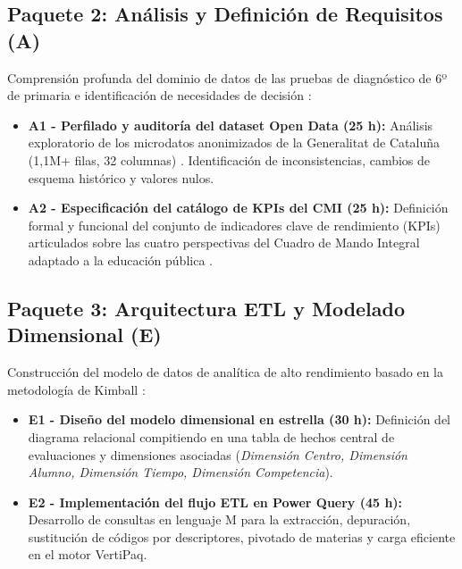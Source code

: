 \documentclass[12pt, a4paper, twoside]{report}
\begin{document}
\subsection{Paquete 2: Análisis y Definición de Requisitos (A)}
Comprensión profunda del dominio de datos de las pruebas de diagnóstico de 6º de primaria e identificación de necesidades de decisión \cite{mandinach2012data}:
\begin{itemize} [itemsep = 7pt]
    \item \textbf{A1 - Perfilado y auditoría del dataset Open Data (25 h):} Análisis exploratorio de los microdatos anonimizados de la Generalitat de Cataluña (1,1M+ filas, 32 columnas) \cite{transparencia_catalunya_2024}. Identificación de inconsistencias, cambios de esquema histórico y valores nulos.
    \item \textbf{A2 - Especificación del catálogo de KPIs del CMI (25 h):} Definición formal y funcional del conjunto de indicadores clave de rendimiento (KPIs) articulados sobre las cuatro perspectivas del Cuadro de Mando Integral adaptado a la educación pública \cite{niven2008balanced, kaplan1992balanced}.
\end{itemize}

\subsection{Paquete 3: Arquitectura ETL y Modelado Dimensional (E)}
Construcción del modelo de datos de analítica de alto rendimiento basado en la metodología de Kimball \cite{kimball2013data}:
\begin{itemize} [itemsep = 9pt]
    \item \textbf{E1 - Diseño del modelo dimensional en estrella (30 h):} Definición del diagrama relacional compitiendo en una tabla de hechos central de evaluaciones y dimensiones asociadas (\textit{Dimensión Centro, Dimensión Alumno, Dimensión Tiempo, Dimensión Competencia}).
    \item \textbf{E2 - Implementación del flujo ETL en Power Query (45 h):} Desarrollo de consultas en lenguaje M para la extracción, depuración, sustitución de códigos por descriptores, pivotado de materias y carga eficiente en el motor VertiPaq.
\end{itemize}
\end{document}
